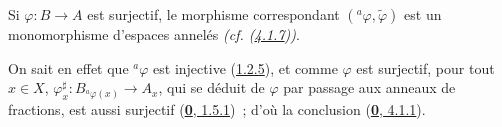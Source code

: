 \begin{corollary}[1.7.5]
\label{I.1.7.5-fr}
Si $\varphi:B\to A$ est surjectif, le morphisme correspondant
$({}^a\varphi,\widetilde\varphi)$ est un monomorphisme d'espaces annelés
\emph{(cf. (\hyperref[I.4.1.7-fr]{4.1.7}))}.
\end{corollary}

On sait en effet que ${}^a\varphi$ est injective
(\hyperref[I.1.2.5-fr]{1.2.5}), et comme $\varphi$ est surjectif, pour tout
$x\in X$, $\varphi_x^{\sharp}:B_{{}^a\varphi(x)}\to A_x$, qui se déduit de
$\varphi$ par passage aux anneaux de fractions, est aussi surjectif
(\hyperref[0.1.5.1-fr]{\textbf{0}, 1.5.1})~; d'où la conclusion
(\hyperref[0.4.1.1-fr]{\textbf{0}, 4.1.1}).
